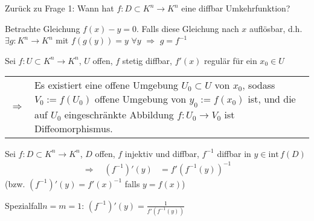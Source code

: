 Zurück zu Frage 1: Wann hat $f:D\subset K^n\to K^n$ eine \gls{diffbar} Umkehrfunktion?

Betrachte Gleichung $f(x) - y=0$. Falls diese Gleichung nach $x$ auflösbar, d.h. $\exists g:K^n\to K^n$ mit $f(g(y)) = y$ $\forall y$ $\Rightarrow$ $g=f^{-1}$

\begin{theorem}
	Sei $f:U\subset K^n\to K^n$, $U$ offen, $f$ stetig \gls{diffbar}, $f'(x)$ regulär für ein $x_0\in U$
	
	\begin{tabularx}{\linewidth}{r@{\ \ }X}
	$\Rightarrow$ & Es existiert eine offene Umgebung $U_0\subset U$ von $x_0$, sodass $V_0:= f(U_0)$ offene Umgebung von $y_0 := f(x_0)$ ist, und die auf $U_0$ eingeschränkte Abbildung $f:U_0\to V_0$ ist Diffeomorphismus.
	\end{tabularx}
\end{theorem}

\begin{proposition}
	Sei $f:D\subset K^n\to K^n$, $D$ offen, $f$ injektiv und \gls{diffbar}, $f^{-1}$ \gls{diffbar} in $y\in \mathrm{int}\, f(D)$ \begin{align}
		\Rightarrow \quad\left(f^{-1}\right)'(y) &= f'\left( f^{-1}(y)\right)^{-1}
	\end{align}
	(bzw. $(f^{-1})'(y) = f'(x)^{-1}$ falls $y=f(x)$)
	
	Spezialfall$ n = m = 1$: $(f^{-1})'(y) = \frac{1}{f'(f^{-1}(y))}$
\end{proposition}


